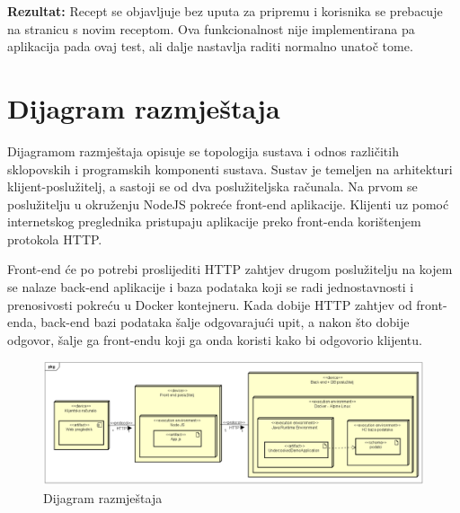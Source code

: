 			\noindent\textbf{Rezultat:} Recept se objavljuje bez uputa za pripremu i korisnika se prebacuje na stranicu s novim receptom. Ova funkcionalnost nije implementirana pa aplikacija pada ovaj test, ali dalje nastavlja raditi normalno unatoč tome.\linebreak
			\eject 
		
		
		\section{Dijagram razmještaja}
			
			
			 Dijagramom razmještaja opisuje se topologija sustava i odnos različitih sklopovskih i programskih komponenti sustava. Sustav je temeljen na arhitekturi klijent-poslužitelj, a sastoji se od dva poslužiteljska računala. Na prvom se poslužitelju u okruženju NodeJS pokreće front-end aplikacije. Klijenti uz pomoć internetskog preglednika pristupaju aplikacije preko front-enda korištenjem protokola HTTP.
			 
			 Front-end će po potrebi proslijediti HTTP zahtjev drugom poslužitelju na kojem se nalaze back-end aplikacije i baza podataka koji se radi jednostavnosti i prenosivosti pokreću u Docker kontejneru. Kada dobije HTTP zahtjev od front-enda, back-end bazi podataka šalje odgovarajući upit, a nakon što dobije odgovor, šalje ga front-endu koji ga onda koristi kako bi odgovorio klijentu.
			\begin{figure}[H]
				\includegraphics[scale=0.35]{slike/dijagram_razmjestaja.png} %
				\centering
				\caption{Dijagram razmještaja}
				\label{fig:Dijagram razmještaja}
			\end{figure}
			\eject 
		
